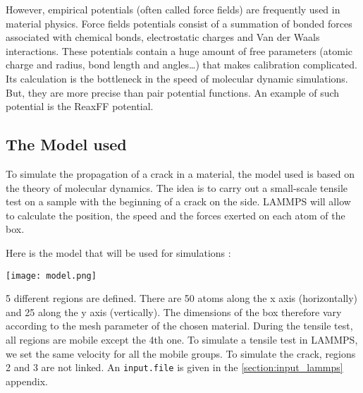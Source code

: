             However, empirical potentials (often called force fields) are frequently used in material physics. Force fields potentials consist of a summation of bonded forces associated with chemical bonds, electrostatic charges and Van der Waals interactions. These potentials contain a huge amount of free parameters (atomic charge and radius, bond length and angles\dots) that makes calibration complicated. Its calculation is the bottleneck in the speed of \gls{molecular dynamic} simulations. But, they are more precise than pair potential functions. An example of such potential is the ReaxFF potential. 


    \subsection{The Model used}
        To simulate the propagation of a crack in a material, the model used is based on the theory of molecular dynamics. The idea is to carry out a small-scale tensile test on a sample with the beginning of a crack on the side. LAMMPS will allow to calculate the position, the speed and the forces exerted on each atom of the box. \medskip
        
        Here is the model that will be used for simulations : 

        \begin{center}
            \captionsetup{type = figure}
            \texttt{[image: model.png]}
        \end{center}

        5 different regions are defined. There are 50 atoms along the x axis (horizontally) and 25 along the y axis (vertically). The dimensions of the box therefore vary according to the mesh parameter of the chosen material. During the tensile test, all regions are mobile except the 4th one. To simulate a tensile test in LAMMPS, we set the same velocity for all the mobile groups. To simulate the crack, regions 2 and 3 are not linked. An \verb|input.file| is given in the \ref{section:input_lammps} appendix.